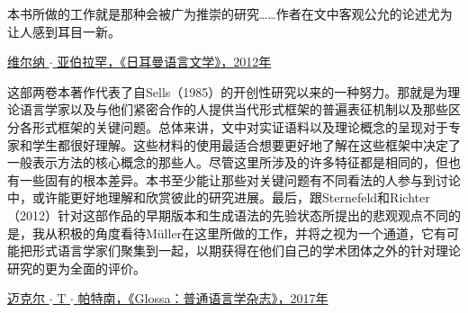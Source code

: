 {\smallskip

\noindent
本书所做的工作就是那种会被广为推崇的研究……作者在文中客观公允的论述尤为让人感到耳目一新。
 \begin{flushright}
\cndash{}\href{http://dx.doi.org/10.1515/germ-2011-537}{维尔纳 $\cdot$ 亚伯拉罕，《日耳曼语言文学》，2012年}
\end{flushright}

\smallskip

\noindent
这部两卷本著作代表了自Sells（1985）的开创性研究以来的一种努力。那就是为理论语言学家以及与他们紧密合作的人提供当代形式框架的普遍表征机制以及那些区分各形式框架的关键问题。总体来讲，文中对实证语料以及理论概念的呈现对于专家和学生都很好理解。这些材料的使用最适合想要更好地了解在这些框架中决定了一般表示方法的核心概念的那些人。尽管这里所涉及的许多特征都是相同的，但也有一些固有的根本差异。本书至少能让那些对关键问题有不同看法的人参与到讨论中，或许能更好地理解和欣赏彼此的研究进展。最后，跟Sternefeld和Richter（2012）针对这部作品的早期版本和生成语法的先验状态所提出的悲观观点不同的是，我从积极的角度看待Müller在这里所做的工作，并将之视为一个通道，它有可能把形式语言学家们聚集到一起，以期获得在他们自己的学术团体之外的针对理论研究的更为全面的评价。
\begin{flushright}
\cndash{}\href{http://doi.org/10.5334/gjgl.414}{迈克尔 $\cdot$ T $\cdot$  帕特南，《Glossa：普通语言学杂志》，2017年}
\end{flushright}


}
